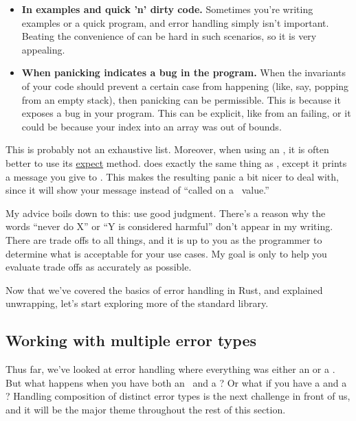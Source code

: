\begin{itemize}
  \item{\textbf{In examples and quick 'n' dirty code.} Sometimes you're writing examples or a quick program, and error 
      handling simply isn't important. Beating the convenience of  can be hard in such scenarios, so it is 
      very appealing.}
  \item{\textbf{When panicking indicates a bug in the program.} When the invariants of your code should prevent a certain 
      case from happening (like, say, popping from an empty stack), then panicking can be permissible. This is because it 
      exposes a bug in your program. This can be explicit, like from an  failing, or it could be because your 
      index into an array was out of bounds.}
\end{itemize}

This is probably not an exhaustive list. Moreover, when using an \option, it is often better to use its 
\href{https://doc.rust-lang.org/std/option/enum.Option.html\#method.expect}{expect} method.  does exactly the 
same thing as , except it prints a message you give to . This makes the resulting panic a bit nicer 
to deal with, since it will show your message instead of \enquote{called  on a \none\ value.}

\blank

My advice boils down to this: use good judgment. There's a reason why the words \enquote{never do X} or \enquote{Y is 
considered harmful} don't appear in my writing. There are trade offs to all things, and it is up to you as the programmer 
to determine what is acceptable for your use cases. My goal is only to help you evaluate trade offs as accurately as possible.

\blank

Now that we've covered the basics of error handling in Rust, and explained unwrapping, let's start exploring more of the 
standard library.

\subsection*{Working with multiple error types}

Thus far, we've looked at error handling where everything was either an  or a . 
But what happens when you have both an \option\ and a \result? Or what if you have a  
and a ? Handling composition of distinct error types is the next challenge in front of us, and it 
will be the major theme throughout the rest of this section.

